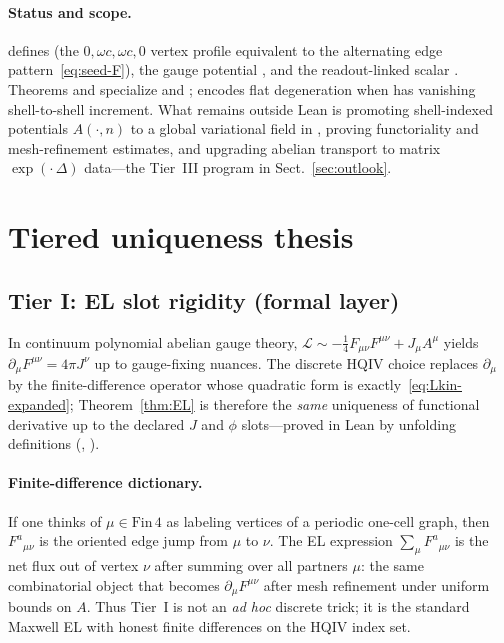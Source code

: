 \documentclass[11pt]{amsart}
\begin{document}
\paragraph{Status and scope.}
 defines  (the \(0,\omega c,\omega c,0\) vertex profile equivalent to the alternating edge pattern~\eqref{eq:seed-F}), the gauge potential , and the readout-linked scalar . Theorems  and  specialize  and ;  encodes flat degeneration when  has vanishing shell-to-shell increment. What remains outside Lean is promoting shell-indexed potentials \(A(\cdot,n)\) to a global variational field in , proving functoriality and mesh-refinement estimates, and upgrading abelian  transport to matrix \(\exp(\cdot\,\Delta)\) data---the Tier~III program in Sect.~\ref{sec:outlook}.

\section{Tiered uniqueness thesis}
\label{sec:tiers}

\subsection{Tier I: EL slot rigidity (formal layer)}

In continuum polynomial abelian gauge theory, \(\mathcal{L}\sim -\tfrac14 F_{\mu\nu}F^{\mu\nu}+J_\mu A^\mu\) yields \(\partial_\mu F^{\mu\nu}=4\pi J^\nu\) up to gauge-fixing nuances. The discrete HQIV choice replaces \(\partial_\mu\) by the finite-difference operator whose quadratic form is exactly~\eqref{eq:Lkin-expanded}; Theorem~\ref{thm:EL} is therefore the \emph{same} uniqueness of functional derivative up to the declared \(J\) and \(\phi\) slots---proved in Lean by unfolding definitions (, ).

\paragraph{Finite-difference dictionary.}
If one thinks of \(\mu\in\mathrm{Fin}\,4\) as labeling vertices of a periodic one-cell graph, then \(F^a{}_{\mu\nu}\) is the oriented edge jump from \(\mu\) to \(\nu\). The EL expression \(\sum_\mu F^a{}_{\mu\nu}\) is the net flux out of vertex \(\nu\) after summing over all partners \(\mu\): the same combinatorial object that becomes \(\partial_\mu F^{\mu\nu}\) after mesh refinement under uniform bounds on \(A\). Thus Tier~I is not an \emph{ad hoc} discrete trick; it is the standard Maxwell EL with honest finite differences on the HQIV index set.
\end{document}
